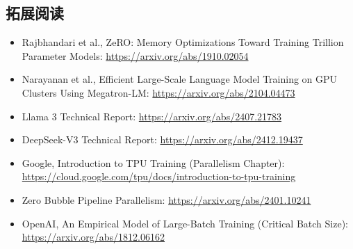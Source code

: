 \subsection{拓展阅读}

\begin{itemize}
    \item Rajbhandari et al., ZeRO: Memory Optimizations Toward Training Trillion Parameter Models: \url{https://arxiv.org/abs/1910.02054}
    \item Narayanan et al., Efficient Large-Scale Language Model Training on GPU Clusters Using Megatron-LM: \url{https://arxiv.org/abs/2104.04473}
    \item Llama 3 Technical Report: \url{https://arxiv.org/abs/2407.21783}
    \item DeepSeek-V3 Technical Report: \url{https://arxiv.org/abs/2412.19437}
    \item Google, Introduction to TPU Training (Parallelism Chapter): \url{https://cloud.google.com/tpu/docs/introduction-to-tpu-training}
    \item Zero Bubble Pipeline Parallelism: \url{https://arxiv.org/abs/2401.10241}
    \item OpenAI, An Empirical Model of Large-Batch Training (Critical Batch Size): \url{https://arxiv.org/abs/1812.06162}
\end{itemize}


